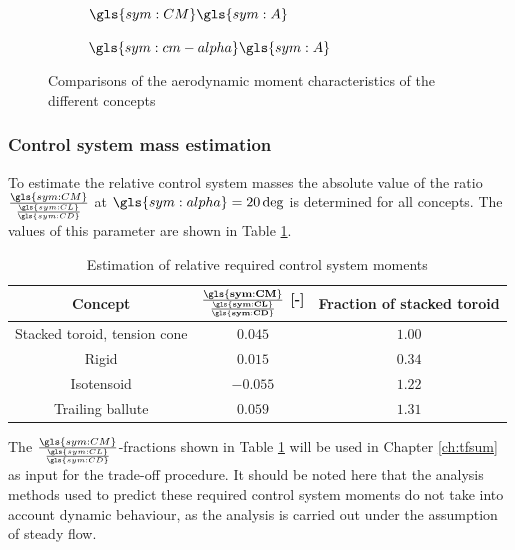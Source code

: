 \begin{figure}[h]
	\centering
	\begin{subfigure}[b]{0.49\textwidth}

		\setlength{} 
		\setlength{}
				

		\caption{$\gls{sym:CM}\gls{sym:A}$}
		\label{fig:cm}
	\end{subfigure}
	\begin{subfigure}[b]{0.49\textwidth}

		\setlength{} 
		\setlength{}
				

		\caption{$\gls{sym:cm-alpha}\gls{sym:A}$}
		\label{fig:cmalpha}
	\end{subfigure}
	\caption{Comparisons of the aerodynamic moment characteristics of the different concepts}
	\label{fig:cmplots}
\end{figure}

\subsubsection{Control system mass estimation}
To estimate the relative control system masses the absolute value of the ratio $\frac{\gls{sym:CM}}{\frac{\gls{sym:CL}}{\gls{sym:CD}}}$ at $\gls{sym:alpha}=20\deg$ is determined for all concepts. The values of this parameter are shown in Table \ref{tab:controlmass}.

\begin{table}[h]
	\centering
	\caption{Estimation of relative required control system moments}
	\begin{tabular}{|c|c|c|}

		\hline
		\textbf{Concept} & $\mathbf{\frac{\gls{sym:CM}}{\frac{\gls{sym:CL}}{\gls{sym:CD}}}}$ [-] & \textbf{Fraction of stacked toroid} \\ \hline \hline

		Stacked toroid, tension cone & $0.045$ & $1.00$\\
		Rigid & $0.015$ & $0.34$ \\
		Isotensoid & $-0.055$ & $1.22$\\
		Trailing ballute & $0.059$ & $1.31$\\
		\hline
	\end{tabular}
	\label{tab:controlmass}
\end{table}

The $\frac{\gls{sym:CM}}{\frac{\gls{sym:CL}}{\gls{sym:CD}}}$-fractions shown in Table \ref{tab:controlmass} will be used in Chapter \ref{ch:tfsum} as input for the trade-off procedure. It should be noted here that the analysis methods used to predict these required control system moments do not take into account dynamic behaviour, as the analysis is carried out under the assumption of steady flow.

